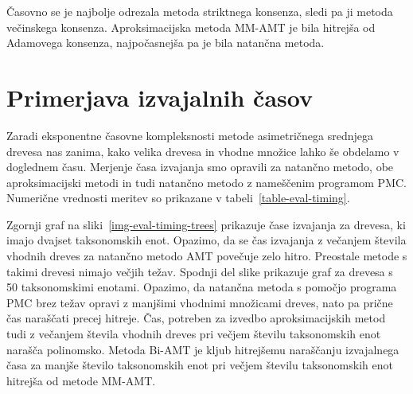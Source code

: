 \documentclass[a4paper, 12pt]{book}
\begin{document}
Časovno se je najbolje odrezala metoda striktnega konsenza, sledi pa ji metoda večinskega
konsenza. Aproksimacijska metoda MM-AMT je bila hitrejša od Adamovega konsenza,
najpočasnejša pa je bila natančna metoda.

\section{Primerjava izvajalnih časov}
Zaradi eksponentne časovne kompleksnosti metode asimetričnega srednjega drevesa nas 
zanima, kako velika drevesa in vhodne množice lahko še obdelamo v doglednem času.
Merjenje časa izvajanja smo opravili za natančno metodo, obe aproksimacijski metodi
in tudi natančno metodo z nameščenim programom PMC.   
Numerične vrednosti meritev so prikazane v tabeli~\ref{table-eval-timing}.

Zgornji graf na sliki~\ref{img-eval-timing-trees} prikazuje čase izvajanja za
drevesa, ki imajo dvajset taksonomskih enot. Opazimo, da se čas izvajanja z 
večanjem števila vhodnih dreves za natančno metodo AMT povečuje zelo hitro. Preostale
metode s takimi drevesi nimajo večjih težav. Spodnji del slike prikazuje graf za
drevesa s 50 taksonomskimi enotami. Opazimo, da natančna metoda s pomočjo programa
PMC brez težav opravi z manjšimi vhodnimi množicami dreves,
nato pa prične čas naraščati precej hitreje. Čas, potreben za izvedbo aproksimacijskih 
metod tudi z večanjem števila vhodnih dreves pri večjem številu 
taksonomskih enot narašča polinomsko. Metoda Bi-AMT je kljub hitrejšemu naraščanju
izvajalnega časa za manjše število taksonomskih enot pri večjem številu taksonomskih 
enot hitrejša od metode MM-AMT. 
\end{document}
